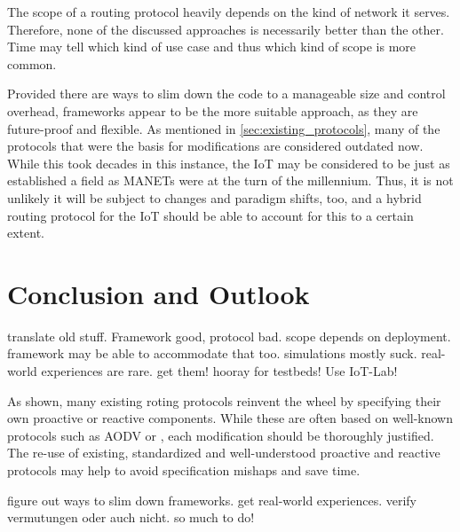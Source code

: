 \documentclass[a4paper,10pt]{scrartcl}
\begin{document}
The scope of a routing protocol heavily depends on the kind of network it serves. Therefore, none of the discussed approaches is necessarily better than the other. Time may tell which kind of use case and thus which kind of scope is more common.

Provided there are ways to slim down the code to a manageable size and control overhead, frameworks appear to be the more suitable approach, as they are future-proof and flexible. As mentioned in \ref{sec:existing_protocols}, many of the protocols that were the basis for modifications are considered outdated now. While this took decades in this instance, the IoT may be considered to be just as established a field as MANETs were at the turn of the millennium. Thus, it is not unlikely it will be subject to changes and paradigm shifts, too, and a hybrid routing protocol for the IoT should be able to account for this to a certain extent.

\section{Conclusion and Outlook}
\label{sec:conclusion}
translate old stuff. Framework good, protocol bad. scope depends on deployment. framework may be able to accommodate that too. simulations mostly suck. real-world experiences are rare. get them!  hooray for testbeds! Use IoT-Lab!

As shown, many existing roting protocols reinvent the wheel by specifying their own proactive or reactive components. While these are often based on well-known protocols such as AODV or , each modification should be thoroughly justified. The re-use of existing, standardized and well-understood proactive and reactive protocols may help to avoid specification mishaps and save time.

figure out ways to slim down frameworks. get real-world experiences. verify vermutungen oder auch nicht. so much to do!


\printglossaries

{\small


}
\end{document}
